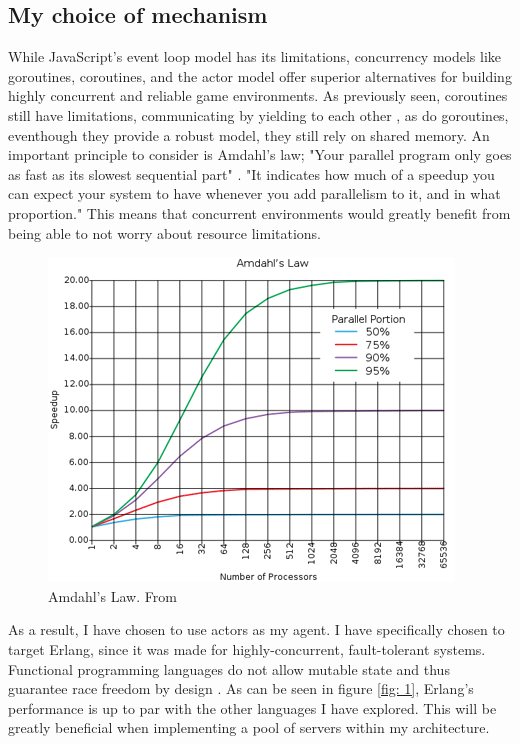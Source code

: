 \documentclass[]{interim}
\begin{document}
\subsection{My choice of mechanism}
While JavaScript’s event loop model has its limitations, concurrency
models like goroutines, coroutines, and the actor model offer superior
alternatives for building highly concurrent and reliable game environments.
As previously seen, coroutines still have limitations, communicating by yielding
to each other \cite{noauthor_introconcurrency_nodate}, as do goroutines,
eventhough they provide a robust model, they still rely on shared memory.
An important principle to consider is Amdahl's law; "Your parallel program only goes as fast as its slowest sequential part" \cite{yang_c_nodate}.
"It indicates how much of a speedup you can expect your system to have whenever
you add parallelism to it, and in what proportion." \cite{yang_c_nodate}
This means that concurrent environments would greatly benefit from being able to
not worry about resource limitations.
\begin{figure}[ht!]
  \centering
  \includegraphics[width=0.7\linewidth]{amdahl}
  \vspace*{-0.3cm}
  \caption{Amdahl's Law. From \cite{noauthor_hitchhikers_nodate}}
  \label{fig: 0}
\end{figure}

As a result, I have chosen to use actors as my agent. I have specifically
chosen to target Erlang, since it was made for highly-concurrent, fault-tolerant
systems. Functional programming languages do not allow mutable state and thus
guarantee race freedom by design \cite{bianchi_survey_2018}.
As can be seen in figure \ref{fig: 1}, Erlang's performance is up to par with the
other languages I have explored. This will be greatly beneficial when implementing
a pool of servers within my architecture.
\end{document}
